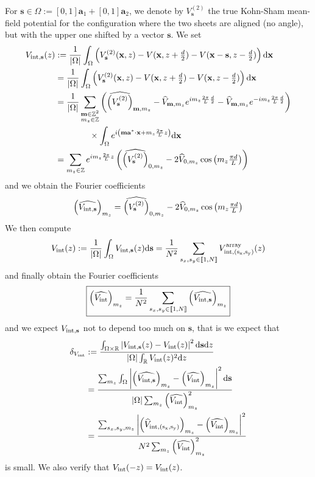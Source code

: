 \documentclass[11pt,a4paper,reqno,french,tikz]{amsart}
\def\d{{\rm d}}
\newcommand{\intent}[1]{\llbracket #1 \rrbracket}
\newcommand{\pa}[1]{\left( #1 \right)} %
\newcommand{\ab}[1]{\left|#1\right|} %
\newcommand{\f}[2]{\frac{#1}{#2}} %
\newcommand{\ind}[1]{_{\textup{#1}}} %
\def\ba{{\mathbf a}}
\def\bx{{\mathbf x}}
\def\bmm{{\mathbf m}}
\def\bs{{\mathbf s}}
\newcommand{\dd}{\tfrac{d}{2}}
\begin{document}
For $\bs \in \Omega := [0,1] \ba_1 + [0,1] \ba_2$, we denote by $V^{(2)}_{\bs}$ the true Kohn-Sham mean-field potential for the configuration where the two sheets are aligned (no angle), but with the upper one shifted by a vector $\bs$. We set
\begin{align*}
	V_{\rm int, \bs}(z) &:= \f{1}{\ab{\Omega}} \int_{\Omega}  \left( V^{(2)}_{\bs}(\bx, z) - V(\bx, z + \dd) - V(\bx - \bs, z -\dd)   \right) \d \bx \\
	&= \f{1}{\ab{\Omega}} \int_{\Omega}  \left( V^{(2)}_{\bs}(\bx, z) - V(\bx, z + \dd) - V(\bx, z -\dd)   \right) \d \bx \\
    &= \f{1}{\ab{\Omega}} \sum_{\substack{\bmm \in \Z^2 \\ m_z \in \Z}}  \pa{ \widehat{\pa{V^{(2)}_{\bs}}}_{\bmm,m_z} - \widehat{V}_{\bmm,m_z}e^{i m_z \f{2\pi}{L} \f{d}{2}} -\widehat{V}_{\bmm,m_z} e^{-i m_z \f{2\pi}{L} \f{d}{2}}} \\
    &\qquad \qquad \times \int_{\Omega} e^{i \pa{\bmm \ba^* \cdot \bx + m_z \f{2\pi}{L} z}}\d \bx \\
    &= \sum_{\substack{m_z \in \Z}} e^{i  m_z \f{2\pi}{L} z} \pa{ \widehat{\pa{V^{(2)}_{\bs}}}_{0,m_z} - 2 \widehat{V}_{0,m_z} \cos\pa{ m_z \tfrac{\pi d}{L} }}
\end{align*}
and we obtain the Fourier coefficients
\begin{align*}
\pa{\widehat{V_{\rm{int},\bs}}}_{m_z} = \widehat{\pa{V^{(2)}_{\bs}}}_{0,m_z} - 2 \widehat{V}_{0,m_z} \cos\pa{ m_z \tfrac{\pi d}{L} }
\end{align*}
We then compute
\begin{align*}
V\ind{int}(z) := \f{1}{\ab{\Omega}} \int_\Omega V_{\rm int, \bs}(z) \d \bs = \f{1}{N^2} \sum_{\substack{s_x,s_y \in \intent{1,N}}} V^{\rm{array}}_{\rm int, (s_x,s_y)}(z)
\end{align*}
and finally obtain the Fourier coefficients
\begin{align*}
\boxed{\pa{\widehat{V\ind{int}}}_{m_z} = \f{1}{N^2} \sum_{\substack{s_x,s_y \in \intent{1,N}}} \pa{\widehat{V_{\rm{int},\bs}}}_{m_z}}
\end{align*}
and we expect $V_{\rm{int},\bs}$ not to depend too much on $\bs$, that is we expect that
\begin{align*}
	\delta_{V\ind{int}} &:= \f{\int_{\Omega\times \R} \ab{V_{\rm{int},\bs}(z) - V\ind{int}(z)}^2 \d \bs \d z}{\ab{\Omega} \int_{\R} V\ind{int}(z)^2 \d z} \\
&= \f{\sum_{m_z} \int_{\Omega} \ab{\pa{\widehat{V_{\rm{int},\bs}}}_{m_z} - \pa{\widehat{V\ind{int}}}_{m_z}}^2 \d \bs }{\ab{\Omega} \sum_{m_z}  \pa{\widehat{V\ind{int}}}_{m_z}^2} \\
&= \f{\sum_{s_x,s_y,m_z} \ab{\pa{\widehat{V}_{\rm{int},(s_x,s_y)}}_{m_z} - \pa{\widehat{V\ind{int}}}_{m_z}}^2 }{N^2 \sum_{m_z}  \pa{\widehat{V\ind{int}}}_{m_z}^2}
\end{align*}
is small. We also verify that $V\ind{int}(-z) = V\ind{int}(z)$.
\end{document}
